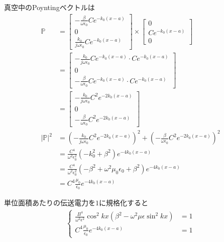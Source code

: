 \documentclass[a4paper,10pt]{bxjsarticle}
\begin{document}
真空中のPoyntingベクトルは
\begin{align*}
    \mathbb{P} &= 
    \begin{bmatrix}
        -\frac{\beta}{\omega \epsilon_0} C e^{-k_0(x-a)} \\
        0 \\
        \frac{k_0}{j\omega \epsilon_0} C e^{-k_0(x-a)}
    \end{bmatrix} \times
    \begin{bmatrix}
        0 \\
        C e^{-k_0(x-a)} \\
        0
    \end{bmatrix} \\
    &= \begin{bmatrix}
        -\frac{k_0}{j\omega \epsilon_0} C e^{-k_0(x-a)} \cdot C e^{-k_0(x-a)} \\
        0 \\
        -\frac{\beta}{\omega \epsilon_0} C e^{-k_0(x-a)} \cdot C e^{-k_0(x-a)}
    \end{bmatrix} \\
    &= \begin{bmatrix}
        -\frac{k_0}{j\omega \epsilon_0} C^2 e^{-2k_0(x-a)} \\
        0 \\
        -\frac{\beta}{\omega \epsilon_0} C^2 e^{-2k_0(x-a)}
    \end{bmatrix} \\
    |\mathbb{P}|^2 &= \left( -\frac{k_0}{j\omega \epsilon_0} C^2 e^{-2k_0(x-a)} \right)^2
                    + \left( -\frac{\beta}{\omega \epsilon_0} C^2 e^{-2k_0(x-a)} \right)^2 \\
    &= \frac{C^4}{\omega^2 \epsilon_0^2} (-k_0^2 + \beta^2) e^{-4k_0(x-a)} \\
    &= \frac{C^4}{\omega^2 \epsilon_0^2} (-\beta^2 + \omega^2 \mu_0 \epsilon_0 + \beta^2) e^{-4k_0(x-a)} \\
    &= C^4 \frac{\mu_0}{\epsilon_0} e^{-4k_0(x-a)} 
\end{align*}

単位面積あたりの伝送電力を$1$に規格化すると
\begin{align*}
    \begin{cases}
        \frac{B^4}{\omega^2 \epsilon^2} \cos^2 kx \left( \beta^2 - \omega^2 \mu \epsilon \sin^2 kx \right) &= 1 \\
        C^4 \frac{\mu_0}{\epsilon_0} e^{-4k_0(x-a)} &= 1
    \end{cases}
\end{align*}
\end{document}
